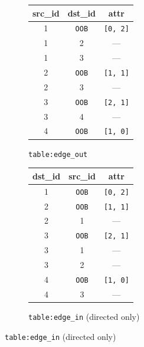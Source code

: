 \begin{figure}[t]
  \centering
  \begin{subfigure}[b]{0.48\columnwidth}
    \centering
    \footnotesize
    \begin{tabular}{|c|c||c|}
      \hline
      \textbf{src\_id} & \textbf{dst\_id} & \textbf{attr} \\
      \hline
      \rowcolor{gray!15} 1 & \texttt{OOB} & \texttt{[0, 2]} \\
      1 & 2 & --- \\
      1 & 3 & --- \\
      \rowcolor{gray!15} 2 & \texttt{OOB} & \texttt{[1, 1]} \\
      2 & 3 & --- \\
      \rowcolor{gray!15} 3 & \texttt{OOB} & \texttt{[2, 1]} \\
      3 & 4 & --- \\
      \rowcolor{gray!15} 4 & \texttt{OOB} & \texttt{[1, 0]} \\
      \hline
    \end{tabular}
    \caption{\texttt{table:edge\_out}}
    \label{fig:schema:ekey-out}
  \end{subfigure}%
  \hfill
  \begin{subfigure}[b]{0.48\columnwidth}
    \centering
    \footnotesize
    \begin{tabular}{|c|c||c|}
      \hline
      \textbf{dst\_id} & \textbf{src\_id} & \textbf{attr} \\
      \hline
      \rowcolor{gray!15} 1 & \texttt{OOB} & \texttt{[0, 2]} \\
      \rowcolor{gray!15} 2 & \texttt{OOB} & \texttt{[1, 1]} \\
      2 & 1 & --- \\
      \rowcolor{gray!15} 3 & \texttt{OOB} & \texttt{[2, 1]} \\
      3 & 1 & --- \\
      3 & 2 & --- \\
      \rowcolor{gray!15} 4 & \texttt{OOB} & \texttt{[1, 0]} \\
      4 & 3 & --- \\
      \hline
    \end{tabular}
    \caption{\texttt{table:edge\_in} (directed only)}
    \label{fig:schema:ekey-in}
  \end{subfigure}


\end{figure}
